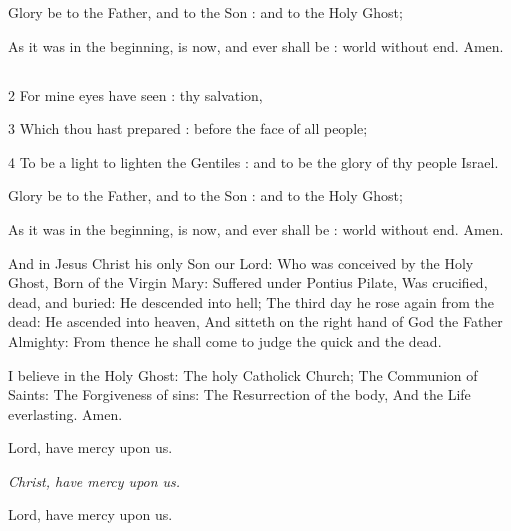 Glory be to the Father, and to the Son : and to the Holy Ghost;

As it was in the beginning, is now, and ever shall be : world without end. Amen.

\medskip

\subsection{}


2 For mine eyes have seen : thy salvation,

3 Which thou hast prepared : before the face of all people;

4 To be a light to lighten the Gentiles : and to be the glory of thy people Israel.

Glory be to the Father, and to the Son : and to the Holy Ghost;

As it was in the beginning, is now, and ever shall be : world without end. Amen.

\medskip


And in Jesus Christ his only Son our Lord: Who was conceived by the Holy Ghost, Born of the Virgin Mary: Suffered under Pontius Pilate, Was crucified, dead, and buried: He descended into hell; The third day he rose again from the dead: He ascended into heaven, And sitteth on the right hand of God the Father Almighty: From thence he shall come to judge the quick and the dead.

I believe in the Holy Ghost: The holy Catholick Church; The Communion of Saints: The Forgiveness of sins: The Resurrection of the body, And the Life everlasting. Amen.

\medskip


\centerline{Lord, have mercy upon us.}
\centerline{\emph{Christ, have mercy upon us.}}
\centerline{Lord, have mercy upon us.}


